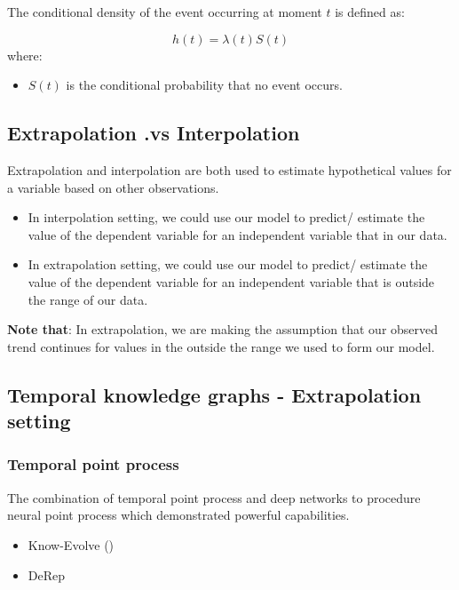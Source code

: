 \documentclass[12pt]{article}
\begin{document}
The conditional density of the event occurring at moment $t$ is defined as:

\begin{equation}
    h(t) = \lambda(t)S(t)
\end{equation}
where:
\begin{itemize}
    \item $S(t)$ is the conditional probability that no event occurs.
\end{itemize}

\subsection{Extrapolation .vs Interpolation}

Extrapolation and interpolation are both used to estimate hypothetical values for a variable based on other observations.
\begin{itemize}
    \item In interpolation setting, we could use our model to predict/ estimate the value of the dependent variable for an 
    independent variable that in our data.
    \item In extrapolation setting, we could use our model to predict/ estimate the value of the dependent variable for an 
    independent variable that is outside the range of our data.
\end{itemize}

\textbf{Note that}: In extrapolation, we are making the assumption that our observed trend continues for values in the outside 
the range we used to form our model.

\subsection{Temporal knowledge graphs - Extrapolation setting}

\subsubsection{Temporal point process}

The combination of temporal point process and deep networks to procedure neural point process which demonstrated 
powerful capabilities.
\begin{itemize}
    \item Know-Evolve (\cite{trivedi2017know})
    \item DeRep
\end{itemize}
\end{document}
